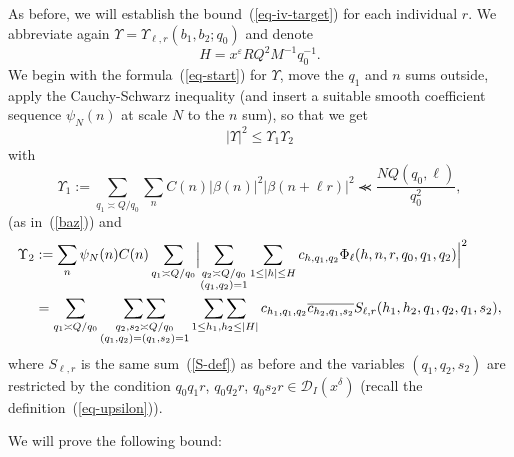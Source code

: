\documentclass[12pt,a4paper,reqno]{amsart}
\numberwithin{equation}{section}
\theoremstyle{plain}
\theoremstyle{definition}
\newcommand\eps{\varepsilon}
\newcommand{\DIone}[2]{\mathcal{D}_{{#1}}({#2})}
\newcommand\sumsum{\mathop{\sum\sum}\limits}
\renewcommand{\sim}{\asymp}
\renewcommand{\lessapprox}{\llcurly}
\begin{document}
As before, we will establish the bound~(\ref{eq-iv-target}) for each
individual $r$. We abbreviate again
$\Upsilon=\Upsilon_{\ell,r}(b_1,b_2;q_0)$ and denote
$$
H=x^{\eps}RQ^2M^{-1}q_0^{-1}.
$$
We begin with the formula~(\ref{eq-start}) for $\Upsilon$, move the
$q_1$ and $n$ sums outside, apply the Cauchy-Schwarz inequality (and
insert a suitable smooth coefficient sequence $\psi_N(n)$ at scale $N$
to the $n$ sum), so that we get
$$
|\Upsilon|^2\leq \Upsilon_1 \Upsilon_2
$$
with
$$
\Upsilon_1:= \sum_{q_1\sim Q/q_0} \sum_n C(n)|\beta(n)|^2 |\beta(n+\ell
r)|^2 \lessapprox \frac{NQ(q_0,\ell)}{q_0^2},
$$
(as in~(\ref{baz})) and
\begin{align*}
  \Upsilon_2&:= \sum_{n}\psi_N(n)C(n)\sum_{q_1\sim Q/q_0} \Bigl|
  \sum_{\substack{q_2 \sim Q/q_0\\(q_1,q_2) = 1}} \sum_{1 \leq |h|
    \leq H} c_{h,q_1,q_2}
  \Phi_{\ell}(h,n, r, q_0, q_1,q_2)\Bigr|^2\\
  &= \sum_{q_1\sim Q/q_0}\sumsum_{\substack{q_2,s_2\sim Q/q_0\\
      (q_1,q_2)=(q_1,s_2)=1 }} \sumsum_{1\leq h_1,h_2\leq |H|}
  c_{h_1,q_1,q_2}\overline{c_{h_2,q_1,s_2}}S_{\ell,r}(h_1,h_2,q_1,q_2,q_1,s_2),
\end{align*}
where $S_{\ell,r}$ is the same sum~(\ref{S-def}) as before and the
variables $(q_1,q_2,s_2)$ are restricted by the condition $q_0q_1r$,
$q_0q_2r$, $q_0s_2r\in \DIone{I}{x^{\delta}}$ (recall the
definition~(\ref{eq-upsilon})).

We will prove the following bound:
\end{document}
